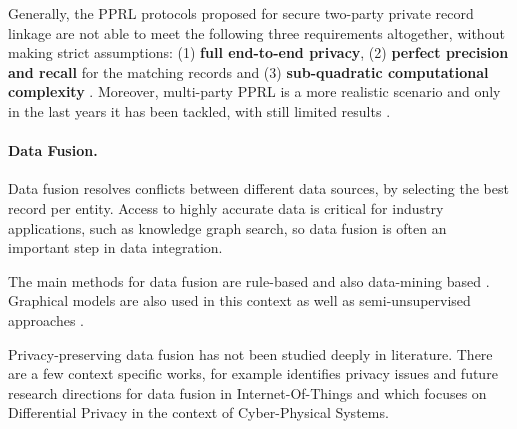 \documentclass[12pt]{article}
\begin{document}
Generally, the PPRL protocols proposed for secure two-party private record linkage are not able to meet the following three requirements altogether, without making strict assumptions: 
(1) \textbf{full end-to-end privacy}, 
(2) \textbf{perfect precision and recall} for the matching records and (3) \textbf{sub-quadratic computational complexity} \cite*{He2017, Groce2019}. 
Moreover, multi-party PPRL is a more realistic scenario and only in the last years it has been tackled, with still limited results \cite*{Vatsalan2016, Vatsalan2017, Vatsalan2020}.

\paragraph{Data Fusion.} Data fusion resolves conflicts between different data sources, by selecting the best record per entity. 
Access to highly accurate data is critical for industry applications, such as knowledge graph search, so data fusion is often 
an important step in data integration.

The main methods for data fusion are rule-based \cite*{dong2009data} and also data-mining based \cite*{Pas2010}. 
Graphical models are also used in this context \cite*{Gao2016} as well as semi-unsupervised approaches \cite*{Reka2017}.

Privacy-preserving data fusion has not been studied deeply in literature. There are a few context specific works, for example \cite*{DING2019129} 
identifies privacy issues and future research directions for data fusion in Internet-Of-Things and \cite*{Gati2021} which focuses on Differential Privacy in the 
context of Cyber-Physical Systems.
\end{document}
